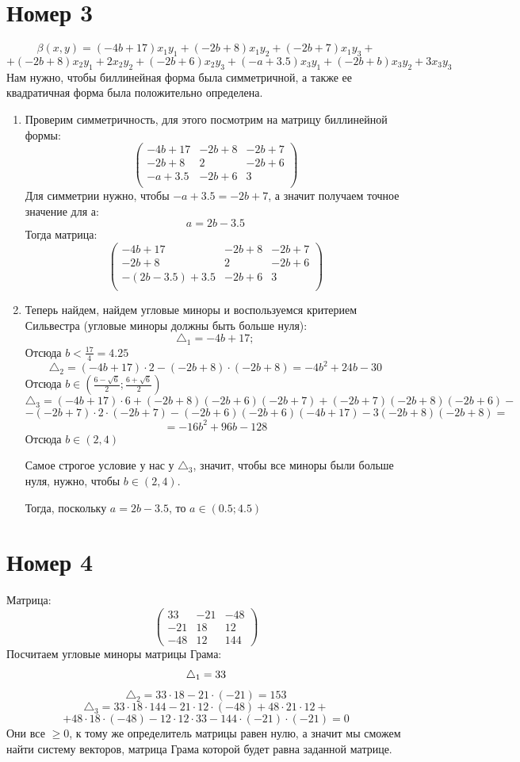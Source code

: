 \documentclass[a4paper,12pt]{article}
\begin{document}
\section*{Номер 3}
\[
\beta (x, y) = (-4b + 17) x_1y_1 + (-2b+8)x_1y_2 + (-2b+7)x_1y_3 +
\]
\[
+
 (-2b+8)x_2y_1 + 2x_2y_2 + (-2b+6)x_2y_3 + (-a + 3.5)x_3y_1  + (-2b + b) x_3y_2 + 3x_3y_3
\]
Нам нужно, чтобы биллинейная форма была симметричной, а также ее квадратичная форма была положительно определена.
\begin{enumerate}
\item
Проверим симметричность, для этого посмотрим на матрицу биллинейной формы:
\[
\begin{pmatrix}
-4b + 17 & -2b + 8 & -2b + 7\\
-2b + 8 & 2& -2b + 6 \\
-a + 3.5 & -2b + 6 &3 \\
\end{pmatrix}
\]
Для симметрии нужно, чтобы $-a + 3.5 = -2b + 7$, а значит получаем точное значение для а:
\[
a = 2b - 3.5
\]
Тогда матрица:
\[
\begin{pmatrix}
-4b + 17 & -2b + 8 & -2b + 7\\
-2b + 8 & 2& -2b + 6 \\
-(2b-3.5) + 3.5 & -2b + 6 &3 \\
\end{pmatrix}
\]
\item Теперь найдем, найдем угловые миноры и воспользуемся критерием Сильвестра (угловые миноры должны быть больше нуля):
\[
\triangle_1 = -4b + 17;
\]
Отсюда $b < \frac{17}{4} = 4.25$
\[
\triangle_2 = (-4b+17) \cdot 2 - (-2b+8) \cdot (-2b+8) = -4b^2 + 24b - 30
\]
Отсюда $b \in \left( \frac{6 - \sqrt{6}}{2}; \frac{6 + \sqrt{6}}{2}\right)$
\[
\triangle_3 = (-4b+17) \cdot 6 + (-2b+8)(-2b+6)(-2b+7) + (-2b+7)(-2b+8)(-2b+6) -
\]
\[
-
 (-2b+7) \cdot 2 \cdot(-2b+7) - (-2b+6)(-2b+6)(-4b+17) -3(-2b+8)(-2b+8) = 
\]
\[
 = -16b^2 + 96b -128
\]
Отсюда $b \in (2, 4)$

Самое строгое условие у нас у $\triangle_3$, значит, чтобы все миноры были больше нуля, нужно, чтобы $b \in (2, 4)$.

Тогда, поскольку $a = 2b -3.5$, то $a \in (0.5;  4.5)$
\end{enumerate}
\section*{Номер 4}
Матрица:
\[
\begin{pmatrix}
33 & -21 & -48 \\
-21 & 18 & 12 \\
-48 & 12 & 144
\end{pmatrix}
\]
Посчитаем угловые миноры матрицы Грама:
\[
\triangle_1 = 33 \\
\]
\[
\triangle_2 = 33 \cdot 18 - 21 \cdot (-21) = 153
\]
\[
\triangle_3 =  33 \cdot 18 \cdot 144 -21 \cdot 12 \cdot (-48) + 48 \cdot 21 \cdot 12 +  
\]
\[
+
48 \cdot 18 \cdot (-48) - 12 \cdot 12 \cdot 33 - 144 \cdot (-21) \cdot (-21) = 0 
\]
Они все $\geq 0 $, к тому же определитель матрицы равен нулю, а значит мы сможем найти систему векторов, матрица Грама которой будет равна заданной матрице.
\end{document}
